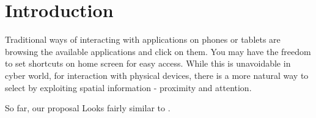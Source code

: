\section{Introduction}
\label{sec:introduction}

Traditional ways of interacting with applications on phones or tablets are browsing the available applications and click on them. You may have the freedom to set shortcuts on home screen for easy access. While this is unavoidable in cyber world, for interaction with physical devices, there is a more natural way to select by exploiting spatial information - proximity and attention.



So far, our proposal Looks fairly similar to \cite{Merrill:2007:ALP:1758156.1758158}.

